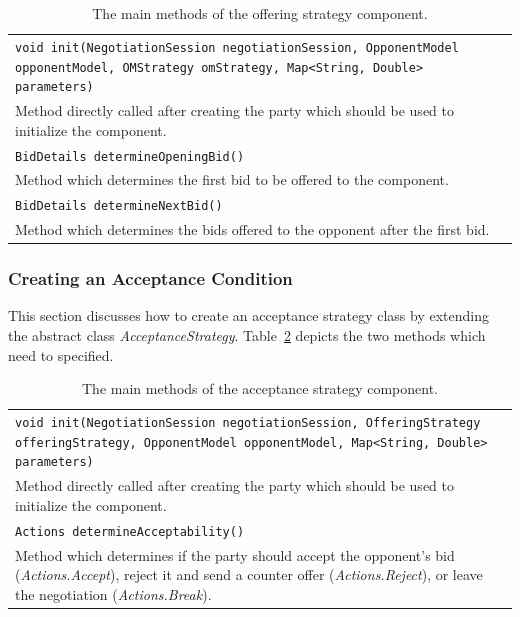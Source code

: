 \documentclass[]{article}
\begin{document}
\begin{table}[h]
\begin{tabular}{m{}}
\hline
\texttt{void init(NegotiationSession negotiationSession, OpponentModel opponentModel, 
	OMStrategy omStrategy, Map<String, Double> parameters)}\\
Method directly called after creating the party which should be used to initialize the component.\\
\hline
\texttt{BidDetails determineOpeningBid()}\\
Method which determines the first bid to be offered to the component.\\
\hline
\texttt{BidDetails determineNextBid()}\\
Method which determines the bids offered to the opponent after the first bid.\\
\hline
\end{tabular}
\caption{The main methods of the offering strategy component.}
\label{tab:BOAbs}
\end{table}


\subsubsection{Creating an Acceptance Condition}
This section discusses how to create an acceptance strategy class by extending the abstract class \textit{AcceptanceStrategy}. Table~\ref{tab:BOAas} depicts the two methods which need to specified.

\begin{table}[h]
\begin{tabular}{m{}}
\hline
\texttt{void init(NegotiationSession negotiationSession, OfferingStrategy offeringStrategy,
			OpponentModel opponentModel, Map<String, Double> parameters)}\\
Method directly called after creating the party which should be used to initialize the component.\\
\hline
\texttt{Actions determineAcceptability()}\\
Method which determines if the party should accept the opponent's bid (\textit{Actions.Accept}), reject it and send a counter offer (\textit{Actions.Reject}), or leave the negotiation (\textit{Actions.Break}).\\
\hline
\end{tabular}
\caption{The main methods of the acceptance strategy component.}
\label{tab:BOAas}
\end{table}
\end{document}
